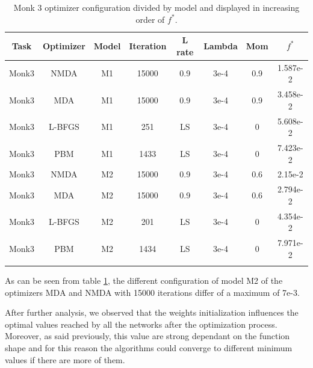 \begin{longtable}{|c|c|c|c|c|c|c|c|}
	\hline
	\centering
	\textbf{Task}&\textbf{Optimizer}&\textbf{Model} &\textbf{Iteration} & \textbf{L rate} & \multicolumn{1}{l|}{\textbf{Lambda}} & \textbf{Mom} & \textbf{$f^{*}$} \\ \hline 
	Monk3 & NMDA & M1 & 15000 & 0.9 & 3e-4  & 0.9 & 1.587e-2 \\
	Monk3 & MDA & M1 & 15000 & 0.9 & 3e-4  & 0.9 & 3.458e-2 	\\
	Monk3 & L-BFGS & M1 & 251 & LS & 3e-4  & 0 & 5.608e-2 		\\
	Monk3 & PBM & M1 & 1433 & LS & 3e-4  & 0 & 7.423e-2 		\\
	Monk3 & NMDA & M2 & 15000 & 0.9 & 3e-4  & 0.6 & 2.15e-2 	\\
	Monk3 & MDA & M2 & 15000 & 0.9 & 3e-4  & 0.6 & 2.794e-2 	\\
	Monk3 & L-BFGS & M2 & 201 & LS & 3e-4  & 0 & 4.354e-2 		\\
	Monk3 & PBM & M2 & 1434 & LS & 3e-4  & 0 & 7.971e-2 		\\
	\hline
	\caption{Monk 3 optimizer configuration divided by model and displayed in increasing order of $f^*$.}
	\label{tab:nets_res_plots_Monk3}
\end{longtable}

As can be seen from table \ref{tab:nets_res_plots_Monk3}, the different configuration of model M2 of the optimizers MDA and NMDA with 15000 iterations differ of a maximum of 7e-3. 

After further analysis, we observed that the weights initialization influences the  optimal values reached by all the networks after the optimization process. Moreover, as said previously, this value are strong dependant on the function shape and for this reason the algorithms could converge to different minimum values if there are more of them. 

